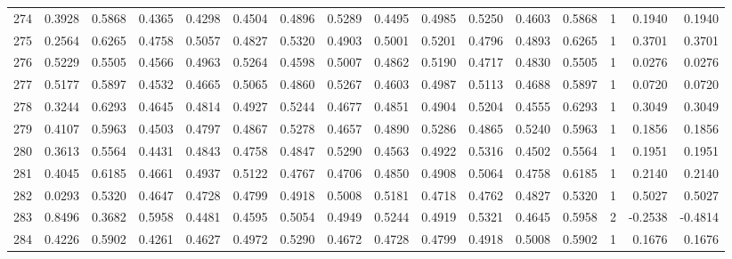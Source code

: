 \begin{tabular}{lrrrrrrrrrrrrrrr}
274 &      0.3928 &  0.5868 &  0.4365 &  0.4298 &  0.4504 &  0.4896 &  0.5289 &  0.4495 &  0.4985 &  0.5250 &   0.4603 &     0.5868 &      1 &                    0.1940 &                     0.1940 \\
275 &      0.2564 &  0.6265 &  0.4758 &  0.5057 &  0.4827 &  0.5320 &  0.4903 &  0.5001 &  0.5201 &  0.4796 &   0.4893 &     0.6265 &      1 &                    0.3701 &                     0.3701 \\
276 &      0.5229 &  0.5505 &  0.4566 &  0.4963 &  0.5264 &  0.4598 &  0.5007 &  0.4862 &  0.5190 &  0.4717 &   0.4830 &     0.5505 &      1 &                    0.0276 &                     0.0276 \\
277 &      0.5177 &  0.5897 &  0.4532 &  0.4665 &  0.5065 &  0.4860 &  0.5267 &  0.4603 &  0.4987 &  0.5113 &   0.4688 &     0.5897 &      1 &                    0.0720 &                     0.0720 \\
278 &      0.3244 &  0.6293 &  0.4645 &  0.4814 &  0.4927 &  0.5244 &  0.4677 &  0.4851 &  0.4904 &  0.5204 &   0.4555 &     0.6293 &      1 &                    0.3049 &                     0.3049 \\
279 &      0.4107 &  0.5963 &  0.4503 &  0.4797 &  0.4867 &  0.5278 &  0.4657 &  0.4890 &  0.5286 &  0.4865 &   0.5240 &     0.5963 &      1 &                    0.1856 &                     0.1856 \\
280 &      0.3613 &  0.5564 &  0.4431 &  0.4843 &  0.4758 &  0.4847 &  0.5290 &  0.4563 &  0.4922 &  0.5316 &   0.4502 &     0.5564 &      1 &                    0.1951 &                     0.1951 \\
281 &      0.4045 &  0.6185 &  0.4661 &  0.4937 &  0.5122 &  0.4767 &  0.4706 &  0.4850 &  0.4908 &  0.5064 &   0.4758 &     0.6185 &      1 &                    0.2140 &                     0.2140 \\
282 &      0.0293 &  0.5320 &  0.4647 &  0.4728 &  0.4799 &  0.4918 &  0.5008 &  0.5181 &  0.4718 &  0.4762 &   0.4827 &     0.5320 &      1 &                    0.5027 &                     0.5027 \\
283 &      0.8496 &  0.3682 &  0.5958 &  0.4481 &  0.4595 &  0.5054 &  0.4949 &  0.5244 &  0.4919 &  0.5321 &   0.4645 &     0.5958 &      2 &                   -0.2538 &                    -0.4814 \\
284 &      0.4226 &  0.5902 &  0.4261 &  0.4627 &  0.4972 &  0.5290 &  0.4672 &  0.4728 &  0.4799 &  0.4918 &   0.5008 &     0.5902 &      1 &                    0.1676 &                     0.1676 \\

\end{tabular}
